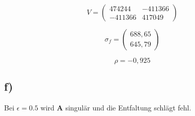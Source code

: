 \begin{equation}
    V = \left(\begin{matrix}
            474244  & -411366\\
            -411366 & 417049
        \end{matrix}\right)
\end{equation}

\begin{equation}
    \sigma_f = \left(\begin{matrix}
                    688,65\\
                    645,79
                \end{matrix}\right)
\end{equation}

\begin{equation}
    \rho = -0,925
\end{equation}

\subsection*{f)}
Bei $\epsilon = 0.5$ wird $\mathbf{A}$ singulär und die Entfaltung schlägt fehl.